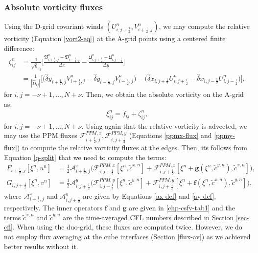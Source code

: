\subsubsection{Absolute vorticity fluxes}
Using the D-grid covariant winds $(U_{i,j+\frac{1}{2}}^n,V_{i+\frac{1}{2},j}^n)$,
we may compute the relative vorticity (Equation \eqref{vort2-eq}) at the A-grid points using a centered finite difference:
\begin{align}
	\label{2d-sw-rv-Dgrid}
	\zeta_{ij}^n &= \frac{1}{\sqrt{\mathfrak{g}}_{ij}}\bigg[
	\frac{\mathfrak{V}_{i+\frac{1}{2},j}^n-\mathfrak{V}_{i-\frac{1}{2},j}^n}{\Delta x} -
	\frac{\mathfrak{U}_{i,j+\frac{1}{2}}^n-\mathfrak{U}_{i,j-\frac{1}{2}}^n}{\Delta y}
	\bigg]\nonumber\\
	&= 
	\frac{1}{|\hat{\Omega}_{ij}|}\bigg[
	{\big({\hat{\delta}y_{i+\frac{1}{2},j}{V}_{i+\frac{1}{2},j}^n-
		   \hat{\delta}y_{i-\frac{1}{2},j}{V}_{i-\frac{1}{2},j}^n}\big)} -
	{\big({\hat{\delta}x_{i,j+\frac{1}{2}}{U}_{i,j+\frac{1}{2}}^n-
		   \hat{\delta}x_{i,j-\frac{1}{2}}{U}_{i,j-\frac{1}{2}}^n}\big)}
	\bigg],
\end{align}
for $i,j=-\nu+1, \ldots, N+\nu$.
Then, we obtain the absolute vorticity on the A-grid as:
\begin{align}
	\label{2d-sw-av-Dgrid}
	\xi_{ij}^n =
	f_{ij} +
	\zeta_{ij}^n,
\end{align}
for $i,j=-\nu+1, \ldots, N+\nu$.
Using again that the relative vorticity is advected, we may use the PPM fluxes
$\mathcal{F}_{i+\frac{1}{2},j}^{PPM,x}, \mathcal{F}_{i,j+\frac{1}{2}}^{PPM,y}$
(Equations \eqref{ppmx-flux} and \eqref{ppmy-flux}) to compute the relative vorticity fluxes at the edges.
Then, its follows from Equation \eqref{q-split} that we need to compute the terms:
\begin{align}
	\label{absvort1}
	F_{i+\frac{1}{2},j}[\xi^{n}, u^n] &= 
	\frac{1}{2}
    \mathcal{A}_{i+\frac{1}{2},j}^{x} \bigg( \mathcal{F}_{i,j+\frac{1}{2}}^{PPM,x}[\xi^{n}, \tilde{c}^{x,n}]+
	\mathcal{F}_{i,j+\frac{1}{2}}^{PPM,x}[\xi^{n} + \mathbf{g}(\xi^{n},\tilde{c}^{y,n}), \tilde{c}^{x,n}] \bigg),\\
	\label{absvort2}
	G_{i,j+\frac{1}{2}}[\xi^{n}, v^n] &= 
	\frac{1}{2}
	\mathcal{A}_{i,j+\frac{1}{2}}^{y}\bigg( \mathcal{F}_{i,j+\frac{1}{2}}^{PPM,y}[\xi^{n}, \tilde{c}^{y,n}]+
	\mathcal{F}_{i,j+\frac{1}{2}}^{PPM,y}[\xi^{n} + \mathbf{f}(\xi^{n},\tilde{c}^{x,n}), \tilde{c}^{y,n}] \bigg),
\end{align}
where $\mathcal{A}_{i+\frac{1}{2},j}^{x}$ and $\mathcal{A}_{i,j+\frac{1}{2}}^{y}$ are given by Equations \eqref{ax-def} and \eqref{ay-def}, respectively.
The inner operators $\mathbf{f}$ and $\mathbf{g}$ are given in \eqref{chp-csfv-tab1}
and the terms $\tilde{c}^{x,n}$ and $\tilde{c}^{y,n}$ are the time-averaged CFL numbers described in Section \ref{sec-cfl}.
When using the duo-grid, these fluxes are computed twice. 
However, we do not employ flux averaging at the cube interfaces (Section \ref{flux-av}) as we achieved better results without it.

